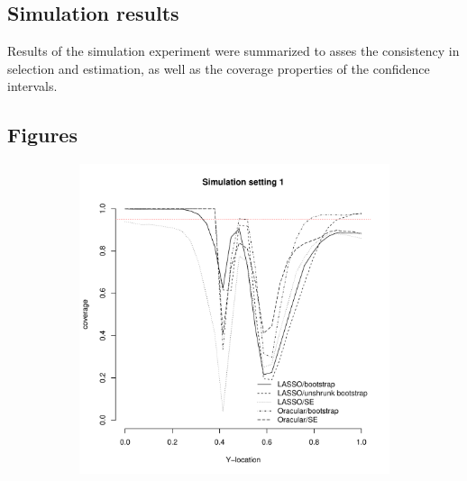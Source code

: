 \documentclass[authoryear, review, 11pt]{elsarticle}
\begin{document}
	\subsection{Simulation results}
	Results of the simulation experiment were summarized to asses the consistency in selection and estimation, as well as the coverage properties of the confidence intervals.
	
	\subsection{Figures}
	\begin{figure}
		\centering
		\begin{subfigure}[b]{0.3\textwidth}
			\centering
			\includegraphics[width=\textwidth]{../../figures/simulation/28-1-profile-coverage.pdf}
			\label{fig:gull}
		\end{subfigure}%
        ~ %
		\begin{subfigure}[b]{0.3\textwidth}
			\centering

\end{subfigure}
\end{figure}
\end{document}
